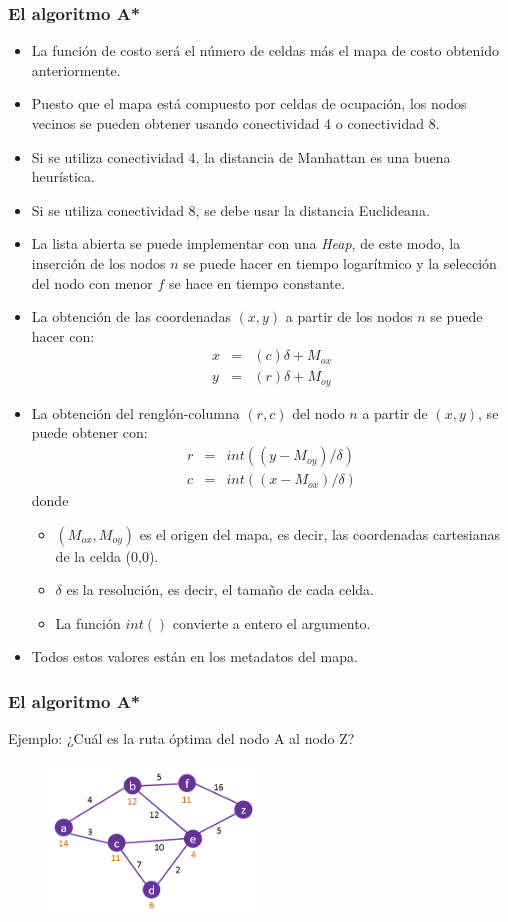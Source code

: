 \begin{frame}\frametitle{El algoritmo A*}
  \begin{itemize}
  \item La función de costo será el número de celdas más el mapa de costo obtenido anteriormente.
  \item Puesto que el mapa está compuesto por celdas de ocupación, los nodos vecinos se pueden obtener usando conectividad 4 o conectividad 8.
  \item Si se utiliza conectividad 4, la distancia de Manhattan es una buena heurística.
  \item Si se utiliza conectividad 8, se debe usar la distancia Euclideana.
  \item La lista abierta se puede implementar con una \textit{Heap}, de este modo, la inserción de los nodos $n$ se puede hacer en tiempo logarítmico y la selección del nodo con menor $f$ se hace en tiempo constante.
  \item La obtención de las coordenadas $(x,y)$ a partir de los nodos $n$ se puede hacer con:
    \begin{eqnarray*}
      x &=& (c)\delta + M_{ox}\\
      y &=& (r)\delta + M_{oy}
    \end{eqnarray*}
  \item La obtención del renglón-columna $(r,c)$ del nodo $n$ a partir de $(x,y)$, se puede obtener con:
    \begin{eqnarray*}
      r &=& int((y - M_{oy})/\delta)\\
      c &=& int((x - M_{ox})/\delta)
    \end{eqnarray*}
    donde
    \begin{itemize}
    \item $(M_{ox}, M_{oy})$ es el origen del mapa, es decir, las coordenadas cartesianas de la celda (0,0).
    \item $\delta$ es la resolución, es decir, el tamaño de cada celda.
    \item La función $int()$ convierte a entero el argumento. 
    \end{itemize}
    \item Todos estos valores están en los metadatos del mapa. 
  \end{itemize}
\end{frame}

\begin{frame}\frametitle{El algoritmo A*}
  Ejemplo: ¿Cuál es la ruta óptima del nodo A al nodo Z?
  \begin{figure}
    \centering
    \includegraphics[width=0.5\textwidth]{Figures/AStarExample.png}
  \end{figure}
\end{frame}

